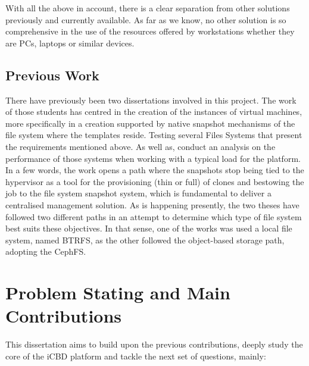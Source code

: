 With all the above in account, there is a clear separation from other solutions previously and currently available. As far as we know, no other solution is so comprehensive in the use of the resources offered by workstations whether they are PCs, laptops or similar devices.
\newpage


\subsection{Previous Work} %
\label{sub:previous_work}

There have previously been two dissertations involved in this project. The work of those students has centred in the creation of the instances of virtual machines, more specifically in a creation supported by native snapshot mechanisms of the file system where the templates reside. Testing several Files Systems that present the requirements mentioned above. As well as, conduct an analysis on the performance of those systems when working with a typical load for the platform. 
In a few words, the work opens a path where the snapshots stop being tied to the hypervisor as a tool for the provisioning (thin or full) of clones and bestowing the job to the file system snapshot system, which is fundamental to deliver a centralised management solution.
As is happening presently, the two theses have followed two different paths in an attempt to determine which type of file system best suits these objectives. 
In that sense, one of the works was used a local file system, named BTRFS, as the other followed the object-based storage path, adopting the CephFS.



\section{Problem Stating and Main Contributions}
\label{sec:project_contributions}

This dissertation aims to build upon the previous contributions, deeply study the core of the iCBD platform and tackle the next set of questions, mainly:

